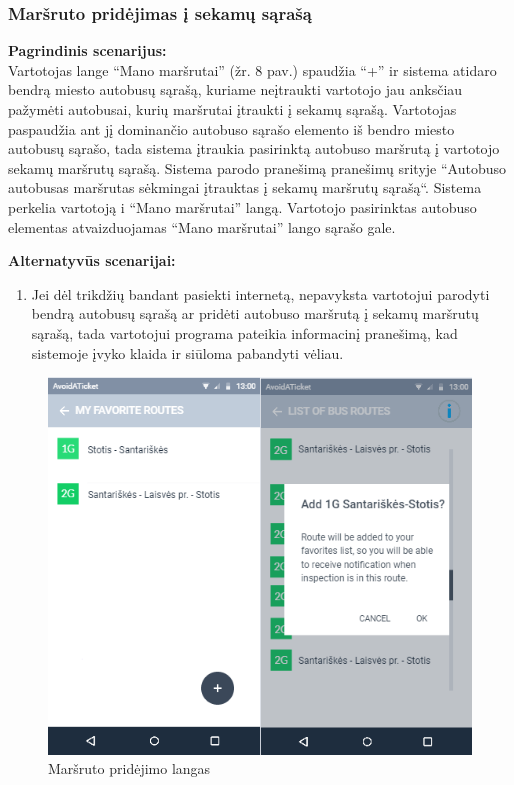 \documentclass{VUMIFPSkursinis}
\begin{document}
\subsubsection{Maršruto pridėjimas į sekamų sąrašą}
	\textbf{Pagrindinis scenarijus:}\\
	Vartotojas lange “Mano maršrutai” (žr. 8 pav.) spaudžia “+” ir sistema atidaro bendrą miesto autobusų sąrašą, kuriame neįtraukti 
	vartotojo jau anksčiau pažymėti autobusai, kurių maršrutai įtraukti į sekamų sąrašą. Vartotojas paspaudžia ant jį 
	dominančio autobuso sąrašo elemento iš bendro miesto autobusų sąrašo, tada sistema įtraukia pasirinktą autobuso maršrutą 
	į vartotojo sekamų maršrutų sąrašą. Sistema parodo pranešimą pranešimų srityje “Autobuso {autobusas} maršrutas sėkmingai 
	įtrauktas į sekamų maršrutų sąrašą“. Sistema perkelia vartotoją i “Mano maršrutai” langą. Vartotojo pasirinktas autobuso 
	elementas atvaizduojamas “Mano maršrutai” lango sąrašo gale.

	\textbf{Alternatyvūs scenarijai:}
	\begin{enumerate}[itemsep=-2mm]
		\item Jei dėl trikdžių bandant pasiekti internetą, nepavyksta vartotojui parodyti bendrą autobusų sąrašą ar pridėti autobuso maršrutą į sekamų maršrutų sąrašą, tada vartotojui programa pateikia informacinį pranešimą, kad sistemoje įvyko klaida ir siūloma pabandyti vėliau.
	\end{enumerate} 
	\begin{figure}[H]
				\centering
				\includegraphics[scale=1.5]{img/mockup_AddRoute}
				\caption{Maršruto pridėjimo langas}
				\label{img:Maršruto pridėjimo langas}
			\end{figure}
\end{document}

